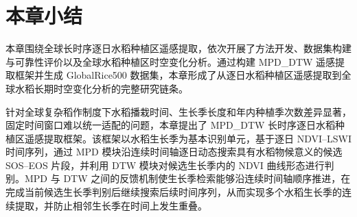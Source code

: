 

\section{本章小结}
本章围绕全球长时序逐日水稻种植区遥感提取，依次开展了方法开发、数据集构建与可靠性评价以及全球水稻种植区时空变化分析。通过构建 MPD\_DTW 遥感提取框架并生成 GlobalRice500 数据集，本章形成了从逐日水稻种植区遥感提取到全球水稻长期时空变化分析的完整研究链条。

针对全球复杂稻作制度下水稻播栽时间、生长季长度和年内种植季次数差异显著，固定时间窗口难以统一适配的问题，本章提出了 MPD\_DTW 长时序逐日水稻种植区遥感提取框架。该框架以水稻生长季为基本识别单元，基于逐日 NDVI--LSWI 时间序列，通过 MPD 模块沿连续时间轴逐日动态搜索具有水稻物候意义的候选 SOS--EOS 片段，并利用 DTW 模块对候选生长季内的 NDVI 曲线形态进行判别。MPD 与 DTW 之间的反馈机制使生长季检索能够沿连续时间轴顺序推进，在完成当前候选生长季判别后继续搜索后续时间序列，从而实现多个水稻生长季的连续提取，并防止相邻生长季在时间上发生重叠。

